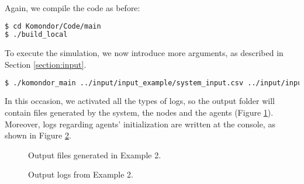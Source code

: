 \documentclass[a4paper]{article}
\begin{document}
Again, we compile the code as before:
\begin{lstlisting}[language=bash]
$ cd Komondor/Code/main
$ ./build_local
\end{lstlisting}

To execute the simulation, we now introduce more arguments, as described in Section \ref{section:input}.
\begin{lstlisting}[language=bash]
$ ./komondor_main ../input/input_example/system_input.csv ../input/input_example/nodes_input.csv ../input/input_example/agents.csv 1 1 1 1 1 1 120 432
\end{lstlisting}

In this occasion, we activated all the types of logs, so the output folder will contain files generated by the system, the nodes and the agents (Figure \ref{fig:output_folder}). Moreover, logs regarding agents' initialization are written at the console, as shown in Figure \ref{fig:example_2_console_output}.

\begin{figure}[h!]
	\centering
	\caption{Output files generated in Example 2.}
	\label{fig:output_folder}
\end{figure}

\begin{figure}[h!]
	\centering
	\caption{Output logs from Example 2.}
	\label{fig:example_2_console_output}
\end{figure}

\newpage


\end{document}
